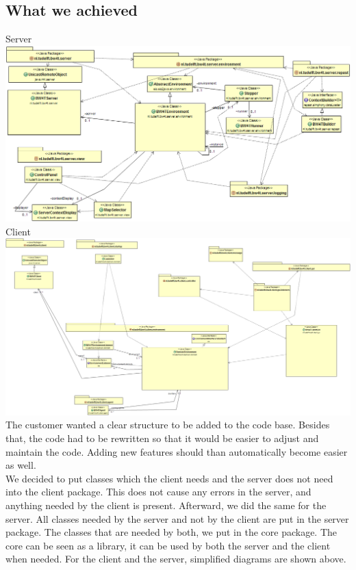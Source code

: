 \subsection{What we achieved}
Server \\
\includegraphics[width=\linewidth]{Transferability/server_simplified_boxed.png}
\\ Client \\
\includegraphics[width=\linewidth]{Transferability/client_simplified_boxed.png}
The customer wanted a clear structure to be added to the code base. Besides that, the code had to be rewritten so that it would be easier to adjust and maintain the code. Adding new features should than automatically become easier as well. \\
\indent We decided to put classes which the client needs and the server does not need into the client package. This does not cause any errors in the server, and anything needed by the client is present. Afterward, we did the same for the server. All classes needed by the server and not by the client are put in the server package. The classes that are needed by both, we put in the core package. The core can be seen as a library, it can be used by both the server and the client when needed. For the client and the server, simplified diagrams are shown above.

